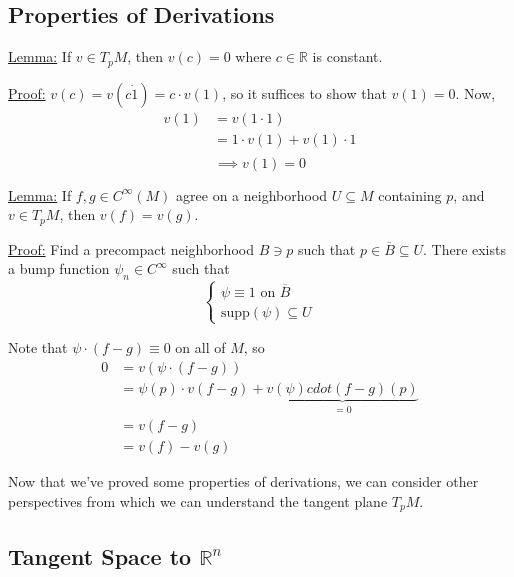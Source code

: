 \documentclass{article}
\newcommand{\R}{\mathbb{R}}
\begin{document}
\vskip 0.5cm
\subsection{Properties of Derivations}

\vskip 0.5cm
\begin{dottedbox}
  \underline{Lemma:} If $v \in T_p M$, then $v(c) = 0$ where $c \in \R$ is constant.

  \vskip 0.5cm
  \underline{Proof:} $v(c) = v(c \dot 1) = c \cdot v(1)$, so it suffices to show that $v(1) = 0$. Now, 
  \begin{align*}
    v(1) &= v(1 \cdot 1) \\
    &= 1 \cdot v(1) + v(1) \cdot 1 \\
  \end{align*}
  \[ \implies v(1) = 0 \]
\end{dottedbox}

\vskip 0.5cm
\begin{dottedbox}
  \underline{Lemma:} If $f, g \in C^{\infty}(M)$ agree on a neighborhood $U \subseteq M$ containing $p$, and $v \in T_pM$, then $v(f) = v(g)$.

  \vskip 0.5cm
  \underline{Proof:} Find a precompact neighborhood $B \ni p$ such that $p \in \overline{B} \subseteq U$. There exists a bump function $\psi_n \in C^{\infty}$ such that 
  \[ \begin{cases}
    \psi \equiv 1 \text{ on } \overline{B} \\
    \text{supp}(\psi) \subseteq U
  \end{cases} \]

  Note that $\psi \cdot (f - g) \equiv 0$ on all of $M$, so 
  \begin{align*}
    0 &= v(\psi \cdot (f - g)) \\
      &= \psi(p) \cdot v(f - g) + \underbrace{v(\psi) cdot (f-g)(p)}_{=0} \\
      &= v(f - g) \\
      &= v(f) - v(g)
  \end{align*}
\end{dottedbox}

\vskip 0.5cm
Now that we've proved some properties of derivations, we can consider other perspectives from which we can understand the tangent plane $T_pM$.

\vskip 0.5cm
\subsection{Tangent Space to $\R^n$}
\end{document}
